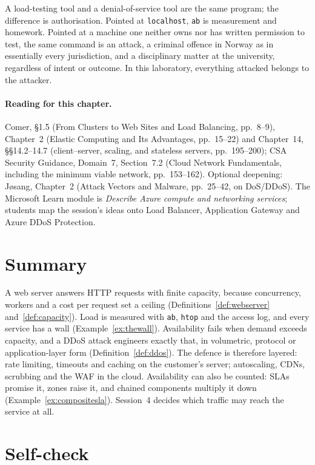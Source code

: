 A load-testing tool and a denial-of-service tool are the same program; the
difference is authorisation. Pointed at \texttt{localhost}, \texttt{ab} is
measurement and homework. Pointed at a machine one neither owns nor has
written permission to test, the same command is an attack, a criminal
offence in Norway as in essentially every jurisdiction, and a disciplinary
matter at the university, regardless of intent or outcome. In this
laboratory, everything attacked belongs to the attacker.

\paragraph{Reading for this chapter.} Comer, \S1.5 (From Clusters to Web
Sites and Load Balancing, pp.~8--9), Chapter~2 (Elastic Computing and Its
Advantages, pp.~15--22) and Chapter~14, \S\S14.2--14.7 (client--server,
scaling, and stateless servers, pp.~195--200); CSA Security Guidance,
Domain~7, Section~7.2 (Cloud Network Fundamentals, including the minimum
viable network, pp.~153--162). Optional deepening: J\o sang, Chapter~2 (Attack
Vectors and Malware, pp.~25--42, on DoS/DDoS). The Microsoft Learn module is
\emph{Describe Azure compute and networking services}; students map the
session's ideas onto Load Balancer, Application Gateway and Azure DDoS
Protection.

\section{Summary}

A web server answers HTTP requests with finite capacity, because
concurrency, workers and a cost per request set a ceiling
(Definitions~\ref{def:webserver} and~\ref{def:capacity}). Load is measured
with \texttt{ab}, \texttt{htop} and the access log, and every service has a
wall (Example~\ref{ex:thewall}). Availability fails when demand exceeds
capacity, and a DDoS attack engineers exactly that, in volumetric, protocol
or application-layer form (Definition~\ref{def:ddos}). The defence is
therefore layered: rate limiting, timeouts and caching on the customer's
server; autoscaling, CDNs, scrubbing and the WAF in the cloud. Availability
can also be counted: SLAs promise it, zones raise it, and chained components
multiply it down (Example~\ref{ex:compositesla}). Session~4 decides which
traffic may reach the service at all.

\section*{Self-check}

